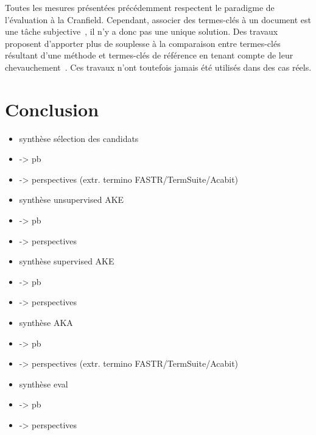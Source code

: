     Toutes les mesures présentées précédemment respectent le paradigme de
    l'évaluation \og{}à la Cranfield\fg{}. Cependant, associer des termes-clés à
    un document est une tâche subjective~\cite{hasan2014state_of_the_art}, il
    n'y a donc pas une unique solution. Des travaux proposent d'apporter plus de
    souplesse à la comparaison entre termes-clés résultant d'une méthode et
    termes-clés de référence en tenant compte de leur
    chevauchement~\cite{zesch2009rprecision,kim2010rprecision}. Ces travaux
    n'ont toutefois jamais été utilisés dans des cas réels.

  \section{Conclusion}
  \label{sec:main-state_of_the_art-automatic_evaluation_of_keyphrase_annotation-conclusion}
    \begin{itemize}
      \item{synthèse sélection des candidats}
      \item{-> pb}
      \item{-> perspectives (extr. termino FASTR/TermSuite/Acabit)}
      \item{synthèse unsupervised AKE}
      \item{-> pb}
      \item{-> perspectives}
      \item{synthèse supervised AKE}
      \item{-> pb}
      \item{-> perspectives}
      \item{synthèse AKA}
      \item{-> pb}
      \item{-> perspectives (extr. termino FASTR/TermSuite/Acabit)}
      \item{synthèse eval}
      \item{-> pb}
      \item{-> perspectives}
    \end{itemize}

